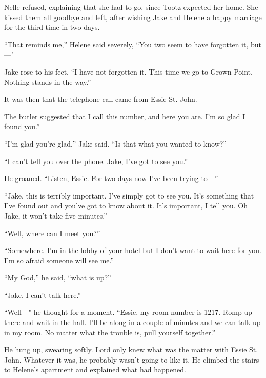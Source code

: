 \documentclass{novel}
\begin{document}
Nelle refused, explaining that she had to go, since Tootz expected her home. She kissed them all goodbye and left, after wishing Jake and Helene a happy marriage for the third time in two days.

“That reminds me,” Helene said severely, “You two seem to have forgotten it, but—"

Jake rose to his feet. “I have not forgotten it. This time we go to Grown Point. Nothing stands in the way.”

It was then that the telephone call came from Essie St. John.

\begin{ChapterStart}
\vspace{3\nbs}
\end{ChapterStart}

The butler suggested that I call this number, and here you are. I’m so glad I found you.”

“I'm glad you’re glad,” Jake said. “Is that what you wanted to know?”

“I can’t tell you over the phone. Jake, I’ve got to see you.”

He groaned. “Listen, Essie. For two days now I've been trying to—”

“Jake, this is terribly important. I’ve simply got to see you. It’s something that I’ve found out and you’ve got to know about it. It’s important, I tell you. Oh Jake, it won’t take five minutes.”

“Well, where can I meet you?”

“Somewhere. I’m in the lobby of your hotel but I don’t want to wait here for you. I’m so afraid someone will see me.”

“My God,” he said, “what is up?”

“Jake, I can’t talk here.”

“Well—" he thought for a moment. “Essie, my room number is 1217. Romp up there and wait in the hall. I’ll be along in a couple of minutes and we can talk up in my room. No matter what the trouble is, pull yourself together.”

He hung up, swearing softly. Lord only knew what was the matter with Essie St. John. Whatever it was, he probably wasn’t going to like it. He climbed the stairs to Helene’s apartment and explained what had happened.
\end{document}
